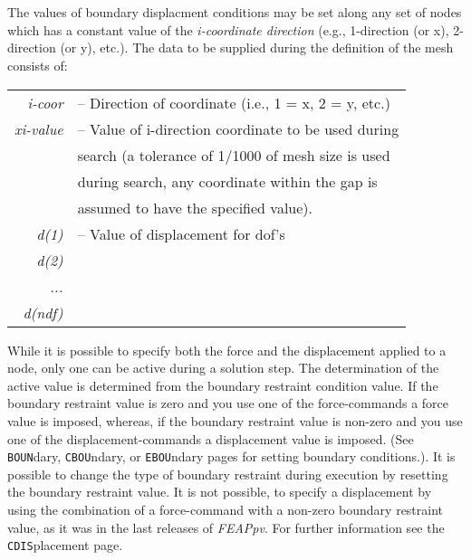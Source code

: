  \\{\smallskip}
 \\{\smallskip}
\headb

The values of boundary displacment conditions may be set
along any set of nodes which has a constant value of the
{\it i-coordinate direction} (e.g., 1-direction (or x), 2-direction
(or y), etc.).  The data to be supplied during the
definition of the mesh consists of:

\begin{center}
\begin{tabular}{r l}
\it i-coor   &-- Direction of coordinate (i.e., 1 = x, 2 = y, etc.) \\
\it xi-value &-- Value of i-direction coordinate to be used during  \\
             &\quad search (a tolerance of 1/1000 of mesh size is used  \\
             &\quad during search, any coordinate within the gap is  \\
             &\quad assumed to have the specified value).  \\
\it d(1)     &-- Value of displacement for dof's  \\
\it d(2)     &   \\
\it ...      &   \\
\it d(ndf)   &   \\
\end{tabular}
\end{center}
While it is possible to specify both the force and the displacement applied
to a node, only one can be active during a solution step.  The determination
of the active value is determined from the boundary
restraint condition value.  If the boundary restraint value is zero
and you use one of the force-commands a force
value is imposed, whereas, if the boundary restraint value is non-zero
and you use one of the displacement-commands a
displacement value is imposed. (See {\tt BOUN}dary, {\tt CBOU}ndary,
or {\tt EBOU}ndary pages for setting boundary
conditions.).  It is possible to change the type of boundary restraint
during execution by resetting the boundary restraint value. It is not
possible, to specify a displacement by using the combination of a 
force-command with a non-zero boundary restraint value, as it was
in the last releases of {\sl FEAPpv}. For further information see the
{\tt CDIS}placement page.

